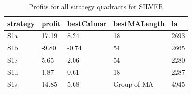 \documentclass{tewiart}
\begin{document}
\newpage
\begin{table}[!t]
\caption{Profits for all strategy quadrants for SILVER}
 \begin{center}
 \begin{tabular}{|l|l|l|l|l|}
 \hline \textbf{strategy} & \textbf{profit} & \textbf{bestCalmar} & \textbf{bestMALength} & \textbf{la} \\ \hline
S1a & 17.19 & 8.24 & 18 & 2693\\ \hline
S1b & -9.80 & -0.74 & 54 & 2665\\ \hline
S1c & 5.65 & 2.06 & 54 & 2280\\ \hline
S1d & 1.87 & 0.61 & 18 & 2287\\ \hline
S1s & 14.85 & 5.68 & Group of MA & 4945\\
\hline \end{tabular}
 \end{center}
 \end{table}
\FloatBarrier
\end{document}
